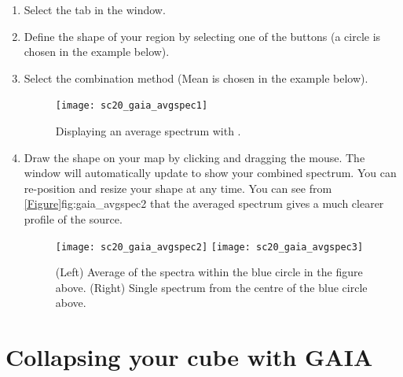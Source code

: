 \documentclass[11pt,oneside,chapters]{starlink}
\begin{document}
\begin{enumerate}[label=(\textbf{\arabic*})]
\item Select the  tab in the  window.

\item Define the shape of your region by selecting one of the
 buttons (a circle is chosen in the example
below).

\item Select the combination method (Mean is chosen in the example below).

\begin{figure}[h!]
\begin{center}
\texttt{[image: sc20\_gaia\_avgspec1]}
\end{center}
\caption[Displaying an average spectrum with \gaia.]{\label{fig:gaia_avgspec1}
  Displaying an average spectrum with \gaia.}
\end{figure}

\item Draw the shape on your map by clicking and dragging the mouse.
The  window will automatically update to show
your combined spectrum. You can re-position and resize your shape at
any time. You can see from \cref{Figure}{fig:gaia_avgspec2}{} that the
averaged spectrum gives a much clearer profile of the source.


\begin{figure}[ht!]
\begin{center}
\texttt{[image: sc20\_gaia\_avgspec2]}
\hspace{0.5mm}
\texttt{[image: sc20\_gaia\_avgspec3]}
\caption[Example of averaged spectra.]{\label{fig:gaia_avgspec2}
 (Left) Average of the spectra within the blue circle in the figure
  above. (Right) Single spectrum from the centre of the blue circle above.}
\end{center}
\end{figure}

\end{enumerate}

\section{Collapsing your cube with GAIA}
\label{sec:gaiacollapse}
\end{document}
